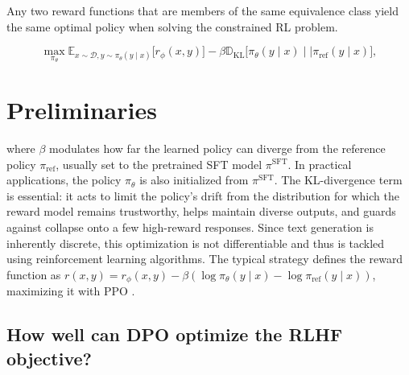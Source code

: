 \begin{lemma}\label{lemma:same_policy}
    Any two reward functions that are members of the same equivalence class yield the same optimal policy when solving the constrained RL problem.
\end{lemma}

\begin{equation}\label{eq:RL}
\max_{\pi_{\theta}}  \mathbb{E}_{x\sim \mathcal{D}, y\sim \pi_{\theta}(y \mid x)}\bigl[r_{\phi}(x, y)\bigr] - \beta\mathbb{D}_{\textrm{KL}}\bigl[\pi_{\theta}(y\mid x)\mid \mid \pi_\text{ref}(y\mid x)\bigr],
\end{equation}

\section{Preliminaries}\label{section:prelims}

where $\beta$ modulates how far the learned policy can diverge from the reference policy $\pi_\text{ref}$, usually set to the pretrained SFT model $\pi^\text{SFT}$. In practical applications, the policy $\pi_\theta$ is also initialized from $\pi^\text{SFT}$. The KL-divergence term is essential: it acts to limit the policy's drift from the distribution for which the reward model remains trustworthy, helps maintain diverse outputs, and guards against collapse onto a few high-reward responses. Since text generation is inherently discrete, this optimization is not differentiable and thus is tackled using reinforcement learning algorithms. The typical strategy \citep{ziegler2020finetuning, stiennon2022learning, bai2022training, ouyang2022training} defines the reward function as ${r(x, y) = r_{\phi}(x, y) -\beta (\log \pi_{\theta}(y\mid x) - \log \pi_\text{ref}(y\mid x))}$, maximizing it with PPO \cite{schulman2017proximal}.

\subsection{How well can DPO optimize the RLHF objective?}

